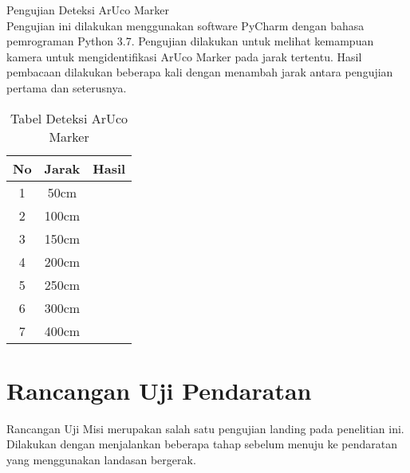 \begin{packed_enum}
	\item Pengujian Deteksi ArUco Marker
	\\ Pengujian ini dilakukan menggunakan software PyCharm dengan bahasa pemrograman Python 3.7. Pengujian dilakukan untuk melihat kemampuan kamera untuk mengidentifikasi ArUco Marker pada jarak tertentu. Hasil pembacaan dilakukan beberapa kali dengan menambah jarak antara pengujian pertama dan seterusnya.
	\begin{table}[h]
		\label{tab:deteksiaruco}
		\centering
		\begin{tabular}{|c|c|c|}
			\hline
			No & Jarak    & Hasil	   \\ \hline
			1  & 50cm     &            \\ \hline
			2  & 100cm    &            \\ \hline
			3  & 150cm    &            \\ \hline
			4  & 200cm    &            \\ \hline
			5  & 250cm    &            \\ \hline
			6  & 300cm    &            \\ \hline
			7  & 400cm    &            \\ \hline
		\end{tabular}
		\caption{Tabel Deteksi ArUco Marker}
	\end{table}
\end{packed_enum}

\section{Rancangan Uji Pendaratan}
Rancangan Uji Misi merupakan salah satu pengujian landing pada penelitian ini. Dilakukan dengan menjalankan beberapa tahap sebelum menuju ke pendaratan yang menggunakan landasan bergerak.


